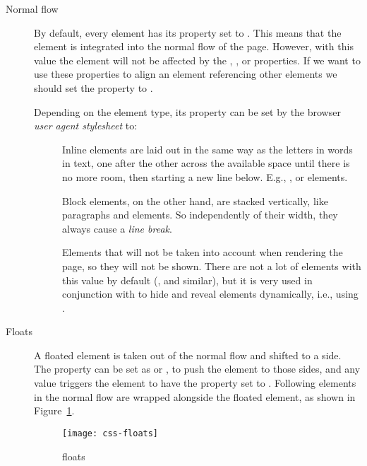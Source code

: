 \begin{description}
  \item[Normal flow] By default, every element has its  property set to .
  This means that the element is integrated into the normal flow of the page.
  However, with this value the element will not be affected by the , ,  or  properties.
  If we want to use these properties to align an element referencing other elements we should set the  property to .
  
  Depending on the element type, its  property can be set by the browser \emph{user agent stylesheet} to:
  \begin{description}
      \item[] Inline elements are laid out in the same way as the letters in words in text, one after the other across the available space until there is no more room, then starting a new line below. E.g., ,  or  elements.
    \item[] Block elements, on the other hand, are stacked vertically, like paragraphs and  elements.
    So independently of their width, they always cause a \emph{line break}.
    \item[] Elements that will not be taken into account when rendering the page, so they will not be shown.
    There are not a lot of elements with this value by default (,  and similar), but it is very used in conjunction with  to hide and reveal elements dynamically, i.e., using .
  \end{description}
  \item[Floats] A floated element is taken out of the normal flow and shifted to a side.
  The property  can be set as  or , to push the element to those sides, and any value triggers the element to have the  property set to .
  Following elements in the normal flow are wrapped alongside the floated element, as shown in Figure~\ref{fig:css-floats}.
  \begin{figure}[htbp]
    \centering
      \texttt{[image: css-floats]}
    \caption{ floats}
    \label{fig:css-floats}
  \end{figure}
  

\end{description}

